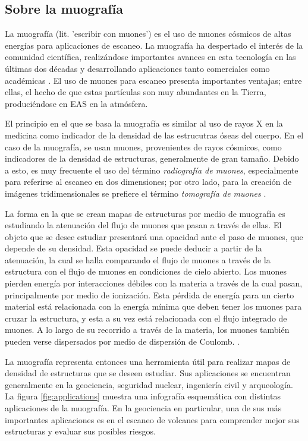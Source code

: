 \documentclass[12pt]{report}
\begin{document}


\subsection*{Sobre la muografía}

La muografía (lit. 'escribir con muones') es el uso de muones cósmicos de altas energías para aplicaciones de escaneo. La muografía ha despertado el interés de la comunidad científica, realizándose importantes avances en esta tecnología en las últimas dos décadas y desarrollando aplicaciones tanto comerciales como académicas \cite{kaiser2019muography}. El uso de muones para escaneo presenta importantes ventajas; entre ellas, el hecho de que estas partículas son muy abundantes en la Tierra, produciéndose en EAS en la atmósfera.

El principio en el que se basa la muografía es similar al uso de rayos X en la medicina como indicador de la densidad de las estrucutras óseas del cuerpo. En el caso de la muografía, se usan muones, provenientes de rayos cósmicos, como indicadores de la densidad de estructuras, generalmente de gran tamaño. Debido a esto, es muy frecuente el uso del término \textit{radiografía de muones}, especialmente para referirse al escaneo en dos dimensiones; por otro lado, para la creación de imágenes tridimensionales se prefiere el término \textit{tomografía de muones} \cite{kaiser2019muography}.

La forma en la que se crean mapas de estructuras por medio de muografía es estudiando la atenuación del flujo de muones que pasan a través de ellas. El objeto que se desee estudiar presentará una opacidad ante el paso de muones, que depende de su densidad. Esta opacidad se puede deducir a partir de la atenuación, la cual se halla comparando el flujo de muones a través de la estructura con el flujo de muones en condiciones de cielo abierto. Los muones pierden energía por interacciones débiles con la materia a través de la cual pasan, principalmente por medio de ionización. Esta pérdida de energía para un cierto material está relacionada con la energía mínima que deben tener los muones para cruzar la estructura, y esta a su vez está relacionada con el flujo integrado de muones. A lo largo de su recorrido a través de la materia, los muones también pueden verse dispersados por medio de dispersión de Coulomb. \cite{lesparre2010geophysical}.

La muografía representa entonces una herramienta útil para realizar mapas de densidad de estructuras que se deseen estudiar. Sus aplicaciones se encuentran generalmente en la geociencia, seguridad nuclear, ingeniería civil y arqueología. La figura \ref{fig:applications} muestra una infografía esquemática con distintas aplicaciones de la muografía. En la geociencia en particular, una de sus más importantes aplicaciones es en el escaneo de volcanes para comprender mejor sus estructuras y evaluar sus posibles riesgos.
\end{document}
